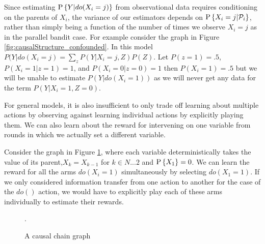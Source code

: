 Since estimating $\P{Y|do(X_i=j)}$ from observational data requires conditioning on the parents of $X_i$, the variance of our estimators depends on $\P{X_i=j|\calP_i}$, rather than simply being a function of the number of times we observe $X_i=j$ as in the parallel bandit case. For example consider the graph in Figure \ref{fig:causalStructure_confounded}. In this model 
$P(Y|do(X_i = j) = \sum_z P(Y|X_i = j,Z)P(Z)$. Let $P(z=1)=.5$, $P(X_i = 1|z = 1) = 1$, and $P(X_i = 0|z = 0) = 1$ then $P(X_i = 1) = .5$ but we will be unable to estimate $P(Y|do(X_i = 1))$ as we will never get any data for the term $P(Y|X_i = 1, Z = 0)$.


For general models, it is also insufficient to only trade off learning about multiple actions by observing against learning individual actions by explicitly playing them. We can also learn about the reward for intervening on one variable from rounds in which we actually set a different variable.


Consider the graph in Figure \ref{fig:causalchain}, where each variable deterministically takes the value of its parent,$X_k = X_{k-1}$ for $k\in {N...2}$ and $\P{X_1} = 0$. We can learn the reward for all the arms $do(X_i = 1)$ simultaneously by selecting $do(X_1 = 1)$. If we only considered information transfer from one action to another for the case of the $do()$ action, we would have to explicitly play each of these arms individually to estimate their rewards. 

\begin{figure}[h]
\centering
\caption{A causal chain graph}.
\label{fig:causalchain}
\end{figure} 


